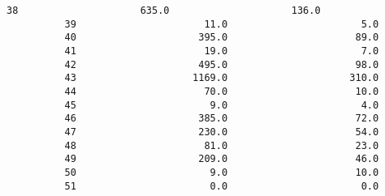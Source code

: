 \documentclass[11pt]{article}
\begin{document}
\begin{Verbatim}[commandchars=\\\{\}]
          38                     635.0                     136.0   
          39                      11.0                       5.0   
          40                     395.0                      89.0   
          41                      19.0                       7.0   
          42                     495.0                      98.0   
          43                    1169.0                     310.0   
          44                      70.0                      10.0   
          45                       9.0                       4.0   
          46                     385.0                      72.0   
          47                     230.0                      54.0   
          48                      81.0                      23.0   
          49                     209.0                      46.0   
          50                       9.0                      10.0   
          51                       0.0                       0.0   
          

\end{Verbatim}
\end{document}
